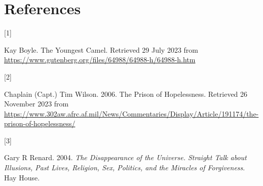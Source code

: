 \documentclass[
  a4paper,
]{article}
\newlength{\cslhangindent}
\newlength{\csllabelwidth}
\newenvironment{CSLReferences}[2] %
 {\begin{list}{}{%
  \setlength{\itemindent}{0pt}
  \setlength{\leftmargin}{0pt}
  \setlength{\parsep}{0pt}
  \ifodd #1
   \setlength{\leftmargin}{\cslhangindent}
   \setlength{\itemindent}{-1\cslhangindent}
  \fi
  \setlength{\itemsep}{#2\baselineskip}}}
 {\end{list}}
\newcommand{\CSLLeftMargin}[1]{\parbox[t]{\csllabelwidth}{\strut#1\strut}}
\newcommand{\CSLRightInline}[1]{\parbox[t]{\linewidth - \csllabelwidth}{\strut#1\strut}}
\begin{document}
\section*{References}\label{bibliography}

\label{refs}
\begin{CSLReferences}{0}{0}
\CSLLeftMargin{{[}1{]} }%
\CSLRightInline{Kay Boyle. {The Youngest Camel}. Retrieved 29 July 2023
from \url{https://www.gutenberg.org/files/64988/64988-h/64988-h.htm}}

\CSLLeftMargin{{[}2{]} }%
\CSLRightInline{Chaplain (Capt.) Tim Wilson. 2006. {The Prison of
Hopelessness}. Retrieved 26 November 2023 from
\url{https://www.302aw.afrc.af.mil/News/Commentaries/Display/Article/191174/the-prison-of-hopelessness/}}

\CSLLeftMargin{{[}3{]} }%
\CSLRightInline{Gary R Renard. 2004. \emph{{The Disappearance of the
Universe}. {Straight Talk about Illusions, Past Lives, Religion, Sex,
Politics, and the Miracles of Forgiveness}}. Hay House.}

\end{CSLReferences}
\end{document}
